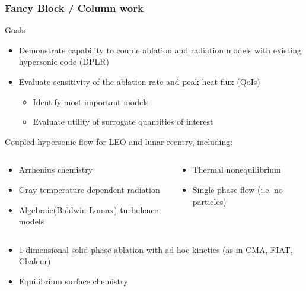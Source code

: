 \documentclass[mathserif]{beamer}
\begin{document}
\begin{frame}                                                                                                                                                                          
\frametitle{Fancy Block / Column work}
\begin{block}{Goals}
\begin{itemize}
\item Demonstrate capability to couple ablation and radiation models with
existing hypersonic code (DPLR)
\item Evaluate sensitivity of the ablation rate and peak heat flux (QoIs)
\begin{itemize}
\item Identify most important models
\item Evaluate utility of surrogate quantities of interest
\end{itemize}
\end{itemize}
\end{block}
\begin{block}{Coupled hypersonic flow for LEO and lunar reentry, including:}
\begin{footnotesize}
\begin{columns}[T]
\begin{column}{5cm}
\begin{itemize}
\item Arrhenius chemistry
\item Gray temperature dependent radiation
\item Algebraic(Baldwin-Lomax) turbulence models
\end{itemize}
\end{column}
\begin{column}{5cm}
\begin{itemize}
\item Thermal nonequilibrium
\item Single phase flow (i.e. no particles)
\end{itemize}
\end{column}
\end{columns}
\begin{itemize}
\item 1-dimensional solid-phase ablation with ad hoc kinetics (as in CMA, FIAT, Chaleur)
\item Equilibrium surface chemistry
\end{itemize}
\end{footnotesize}
\end{block}
\end{frame}


\begin{frame}
\frametitle{}
\begin{block}{}
 \\
\end{block}
\end{frame}

 
\end{document}
